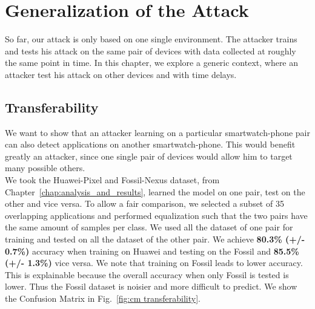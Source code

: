 \chapter{Generalization of the Attack}
\label{chap:Generalization}

So far, our attack is only based on one single environment. The attacker trains and tests his attack on the same pair of devices with data collected at roughly the same point in time. In this chapter, we explore a generic context, where an attacker test his attack on other devices and with time delays.

\section{Transferability}
We want to show that an attacker learning on a particular smartwatch-phone pair can also detect applications on another smartwatch-phone. This would benefit greatly an attacker, since one single pair of devices would allow him to target many possible others. 
\\

We took the Huawei-Pixel and Fossil-Nexus dataset, from Chapter~\ref{chap:analysis_and_results}, learned the model on one pair, test on the other and vice versa. To allow a fair comparison, we selected a subset of 35 overlapping applications and performed equalization such that the two pairs have the same amount of samples per class. We used all the dataset of one pair for training and tested on all the dataset of the other pair. We achieve \textbf{80.3\% (+/- 0.7\%)} accuracy when training on Huawei and testing on the Fossil and \textbf{85.5\% (+/- 1.3\%)} vice versa. We note that training on Fossil leads to lower accuracy. This is explainable because the overall accuracy when only Fossil is tested is lower. Thus the Fossil dataset is noisier and more difficult to predict. We show the Confusion Matrix in Fig.~\ref{fig:cm transferability}. 
\\

